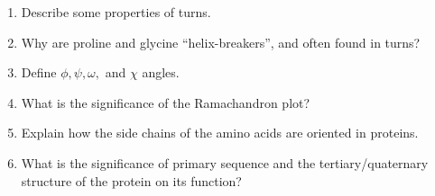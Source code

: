 \begin{enumerate}
\item Describe some properties of turns.


\item Why are proline and glycine ``helix-breakers'', and often found in turns?


\item Define $\phi, \psi, \omega,$ and $\chi$ angles.


\item What is the significance of the Ramachandron plot?


\item Explain how the side chains of the amino acids are oriented in proteins.


\item What is the significance of primary sequence and the tertiary/quaternary structure of the protein on its function?


\end{enumerate}
